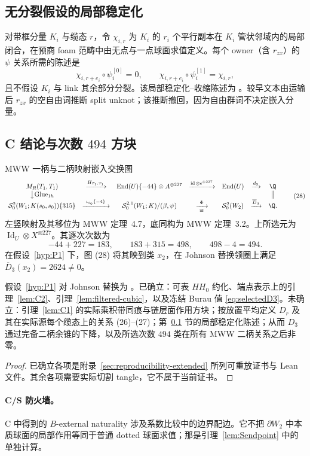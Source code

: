 \subsection{无分裂假设的局部稳定化}
\label{sec:local-stabilization}

对带框分量 $K_i$ 与缆态 $r$，令 $\chi_{i,r}$ 为 $K_i$ 的 $r_i$ 个平行副本在 $K_i$ 管状邻域内的局部闭合，在预商 foam 范畴中由无点与一点球面求值定义。每个 owner（含 $r_{zx}$）的 $\psi$ 关系所需的陈述是
\[
\chi_{i,r+e_i}\circ\psi_i^{[0]}=0,\qquad
\chi_{i,r+e_i}\circ\psi_i^{[1]}=\chi_{i,r},
\]
且不假设 $K_i$ 与 link 其余部分分裂。该局部稳定化--收缩陈述为 \Open。较早文本由运输后 $r_{zx}$ 的空自由词推断 split unknot；该推断撤回，因为自由群词不决定嵌入分量。

\subsection{C 结论与次数 $494$ 方块}

MWW 一柄与二柄映射嵌入交换图
\[
\begin{array}{ccccccc}
M_R(T_1,T_1)&\xrightarrow{H_{T_1,T_1}}&
\operatorname{End}(U)\{-44\}\otimes A^{\otimes227}
&\xrightarrow{\operatorname{id}\otimes\epsilon^{\otimes227}}&
\operatorname{End}(U)&\xrightarrow{d_3}&\Q\\
\big\downarrow{\mathrm{Glue}_{1h}}&&&&&&\big\Vert\\
\mathcal S^2_0(W_1;K(s_0,s_0))\{315\}
&\xrightarrow{\ \iota_{s_0}\{-4\}\ }&
\mathcal S^{2,0}_0(W_1;K)/(\beta,\psi)
&\xrightarrow[\cong]{\ \Phi\ }&\mathcal S^2_0(W_2)
&\xrightarrow{\overline D_3}&\Q.
\end{array}
\tag{28}
\]
左竖映射及其移位为 MWW 定理~4.7，底同构为 MWW 定理~3.2。上所选元为 $\operatorname{Id}_U\otimes X^{\otimes227}$。其逐次次数为
\[
-44+227=183,\qquad183+315=498,\qquad498-4=494.
\]
在假设~\ref{hyp:P1} 下，图 (28) 将其映到类 $x_2$，在 Johnson 替换领圈上满足 $\overline D_3(x_2)=2624\ne0$。

\begin{proposition}[C 的状态]\label{thm:Cdischarge}
假设~\ref{hyp:P1} 对 Johnson 替换为 \Open。已确立：可表 $HH_0$ 约化、端点表示上的引理~\ref{lem:C2}、引理~\ref{lem:filtered-cubic}，以及冻结 Burau 值 \eqref{eq:selectedD3}。未确立：引理~\ref{lem:C1} 的实际乘积带同痕与链层面作用方块；按放置平均定义 $D_r$ 及其在实际源每个缆态上的关系 (26)--(27)；第~\ref{sec:local-stabilization} 节的局部稳定化陈述；从而 $D_3$ 通过完备二柄余锥的下降，以及所选次数 $494$ 类在所有 MWW 二柄关系之后非零。
\end{proposition}

\begin{proof}
已确立各项是附录~\ref{sec:reproducibility-extended} 所列可重放证书与 Lean 文件。其余各项需要实际切割 tangle，它不属于当前证书。
\end{proof}

\paragraph{C/S 防火墙。}
C 中得到的 $B$-external naturality 涉及系数比较中的边界配边。它不把 $\partial W_2$ 中本质球面的局部作用等同于普通 dotted 球面求值；那是引理~\ref{lem:Sendpoint} 中的单独计算。
